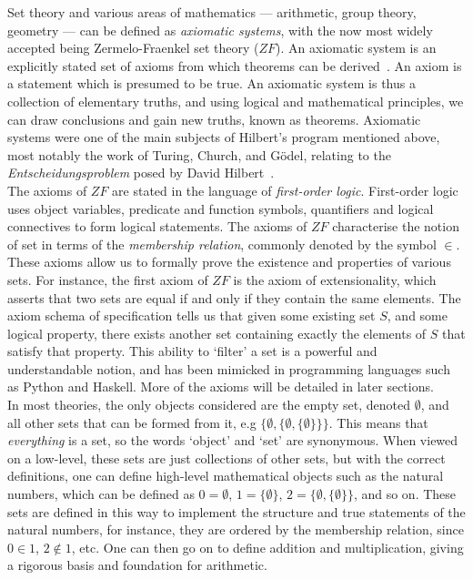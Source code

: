 \documentclass[11pt]{report}
\theoremstyle{definition}
\theoremstyle{theorem}
\theoremstyle{lemma}
\begin{document}
Set theory and various areas of mathematics --- arithmetic, group theory, geometry --- can be defined as \emph{axiomatic systems}, with the now most widely accepted being Zermelo-Fraenkel set theory ($\mathit{ZF}$).
An axiomatic system is an explicitly stated set of axioms from which theorems can be derived~\cite{wolfaxiom}.
An axiom is a statement which is presumed to be true.
An axiomatic system is thus a collection of elementary truths, and using logical and mathematical principles, we can draw conclusions and gain new truths, known as theorems.
Axiomatic systems were one of the main subjects of Hilbert's program mentioned above, most notably the work of Turing, Church, and G\"odel, relating to the \emph{Entscheidungsproblem} posed by David Hilbert~\cite{stancomput}.\\


The axioms of $\mathit{ZF}$ are stated in the language of \emph{first-order logic}.
First-order logic uses object variables, predicate and function symbols, quantifiers and logical connectives to form logical statements.
The axioms of $\mathit{ZF}$ characterise the notion of set in terms of the \emph{membership relation}, commonly denoted by the symbol $\in$.
These axioms allow us to formally prove the existence and properties of various sets.
For instance, the first axiom of $\mathit{ZF}$ is the axiom of extensionality, which asserts that two sets are equal if and only if they contain the same elements.
The axiom schema of specification tells us that given some existing set $S$, and some logical property, there exists another set containing exactly the elements of $S$ that satisfy that property.
This ability to `filter' a set is a powerful and understandable notion, and has been mimicked in programming languages such as Python and Haskell. 
More of the axioms will be detailed in later sections.\\

In most theories, the only objects considered are the empty set, denoted $\emptyset$, and all other sets that can be formed from it, e.g $\{\emptyset, \{\emptyset, \{\emptyset\}\}\}$. 
This means that \emph{everything} is a set, so the words `object' and `set' are synonymous.
When viewed on a low-level, these sets are just collections of other sets, but with the correct definitions, one can define high-level mathematical objects such as the natural numbers, which can be defined as $0 = \emptyset$, $1=\{\emptyset\}$, $2=\{\emptyset, \{\emptyset\}\}$, and so on.
These sets are defined in this way to implement the structure and true statements of the natural numbers, for instance, they are ordered by the membership relation, since $0\in 1$, $2\notin 1$, etc.
One can then go on to define addition and multiplication, giving a rigorous basis and foundation for arithmetic.
\end{document}
